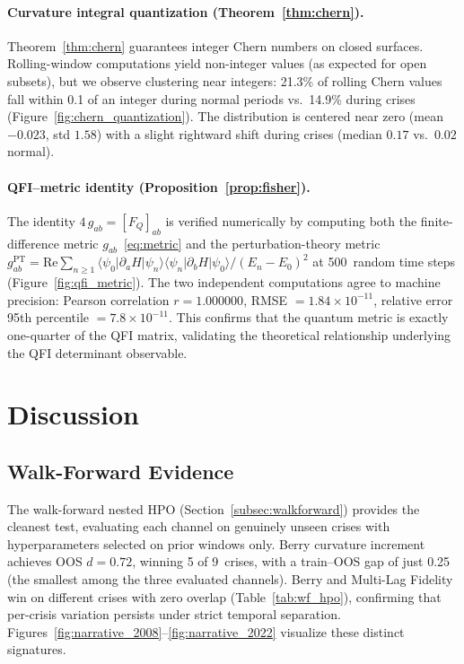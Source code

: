 \documentclass[3p]{elsarticle}
\begin{document}
\paragraph{Curvature integral quantization (Theorem~\ref{thm:chern}).}
Theorem~\ref{thm:chern} guarantees integer Chern numbers on closed
surfaces.  Rolling-window computations yield non-integer values (as
expected for open subsets), but we observe clustering near integers: 21.3\%
of rolling Chern values fall within 0.1 of an integer during normal
periods vs.\ 14.9\% during crises
(Figure~\ref{fig:chern_quantization}).  The distribution is centered near
zero (mean $-0.023$, std $1.58$) with a slight rightward shift during
crises (median $0.17$ vs.\ $0.02$ normal).

\paragraph{QFI--metric identity (Proposition~\ref{prop:fisher}).}
The identity $4\,g_{ab} = [F_Q]_{ab}$ is verified numerically by
computing both the finite-difference metric
$g_{ab}$~\eqref{eq:metric} and the perturbation-theory metric
$g_{ab}^{\text{PT}} = \text{Re}\sum_{n \geq 1}
\langle\psi_0|\partial_a H|\psi_n\rangle
\langle\psi_n|\partial_b H|\psi_0\rangle / (E_n - E_0)^2$
at 500~random time steps (Figure~\ref{fig:qfi_metric}).  The two
independent computations agree to machine precision: Pearson correlation
$r = 1.000000$, RMSE $= 1.84 \times 10^{-11}$, relative error 95th
percentile $= 7.8 \times 10^{-11}$.  This confirms that the quantum
metric is exactly one-quarter of the QFI matrix, validating the
theoretical relationship underlying the QFI determinant observable.

\section{Discussion}\label{sec:discussion}

\subsection{Walk-Forward Evidence}

The walk-forward nested HPO (Section~\ref{subsec:walkforward}) provides
the cleanest test, evaluating each channel on genuinely unseen crises with
hyperparameters selected on prior windows only.
Berry curvature increment achieves OOS $d = 0.72$, winning 5 of
9~crises, with a train--OOS gap of just 0.25 (the smallest among
the three evaluated channels).  Berry and Multi-Lag Fidelity win on
different crises with zero overlap (Table~\ref{tab:wf_hpo}),
confirming that per-crisis variation persists under strict temporal
separation.
Figures~\ref{fig:narrative_2008}--\ref{fig:narrative_2022} visualize
these distinct signatures.
\end{document}
